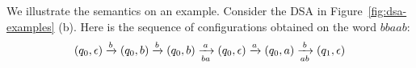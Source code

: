 

We illustrate the semantics on an example. Consider the DSA in Figure~\ref{fig:dsa-examples} (b). Here is the sequence of configurations obtained on the word $bbaab$:
\begin{align*}
(q_0, \epsilon) \xrightarrow{b} (q_0, b) \xrightarrow{b} (q_0, b) \xrightarrow[ba]{a} (q_0, \epsilon) \xrightarrow{a} (q_0, a) \xrightarrow[ab]{b} (q_1, \epsilon)
\end{align*}

